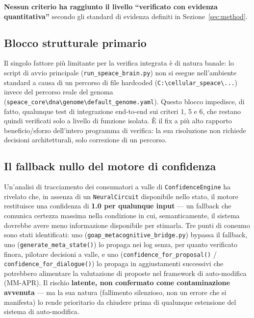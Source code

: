 \documentclass[11pt,a4paper]{article}
\newcommand{\code}[1]{\texttt{#1}}
\begin{document}
\noindent
\textbf{Nessun criterio ha raggiunto il livello ``verificato con evidenza quantitativa''} secondo gli standard di evidenza definiti in Sezione~\ref{sec:method}.

\subsection{Blocco strutturale primario}
\label{sec:blocco}

Il singolo fattore pi\`u limitante per la verifica integrata \`e di natura banale: lo script di avvio principale (\code{run\_speace\_brain.py}) non si esegue nell'ambiente standard a causa di un percorso di file hardcoded (\code{C:\textbackslash cellular\_speace\textbackslash ...}) invece del percorso reale del genoma (\code{speace\_core\textbackslash dna\textbackslash genome\textbackslash default\_genome.yaml}). Questo blocco impedisce, di fatto, qualunque test di integrazione end-to-end sui criteri 1, 5 e 6, che restano quindi verificati solo a livello di funzione isolata. \`E il fix a pi\`u alto rapporto beneficio/sforzo dell'intero programma di verifica: la sua risoluzione non richiede decisioni architetturali, solo correzione di un percorso.

\subsection{Il fallback nullo del motore di confidenza}
\label{sec:fallback}

Un'analisi di tracciamento dei consumatori a valle di \code{ConfidenceEngine} ha rivelato che, in assenza di un \code{NeuralCircuit} disponibile nello stato, il motore restituisce una confidenza di \textbf{1.0 per qualunque input} --- un fallback che comunica certezza massima nella condizione in cui, semanticamente, il sistema dovrebbe avere meno informazione disponibile per stimarla. Tre punti di consumo sono stati identificati: uno (\code{goap\_metacognitive\_bridge.py}) bypassa il fallback, uno (\code{generate\_meta\_state()}) lo propaga nei log senza, per quanto verificato finora, pilotare decisioni a valle, e uno (\code{confidence\_for\_proposal()} / \code{confidence\_for\_dialogue()}) lo propaga in aggiustamenti successivi che potrebbero alimentare la valutazione di proposte nel framework di auto-modifica (MM-APR). Il rischio \textbf{latente, non confermato come contaminazione avvenuta} --- ma la sua natura (fallimento silenzioso, non un errore che si manifesta) lo rende prioritario da chiudere prima di qualunque estensione del sistema di auto-modifica.
\end{document}
